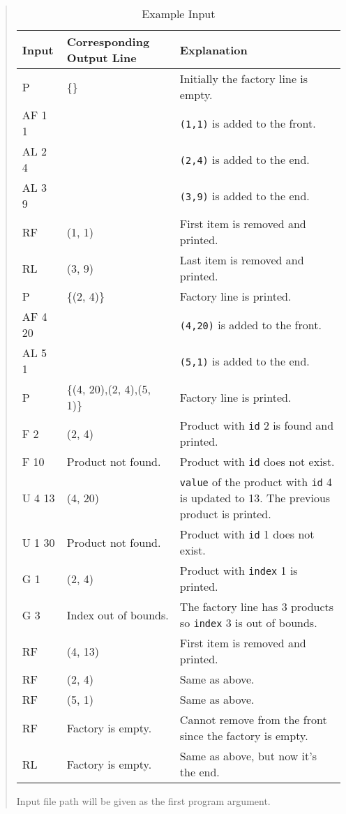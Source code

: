 \documentclass[12pt]{article}
\begin{document}
\begin{quote}
\begin{table}[H]
    \centering
    \begin{tabular}{||p{1.5cm}|p{3.8cm}|p{7cm}||}
        \hline
        \hline
        \textbf{Input} & \textbf{Corresponding \newline Output Line} & \textbf{Explanation}  \\
        \hline
        \hline
        P & \{\} & Initially the factory line is empty.  \\ 
        \hline
        AF 1 1 & & \texttt{(1,1)} is added to the front. \\
        \hline
        AL 2 4 & & \texttt{(2,4)} is added to the end. \\
        \hline
        AL 3 9 & & \texttt{(3,9)} is added to the end. \\
        \hline
        RF & (1, 1) & First item is removed and printed. \\
        \hline
        RL & (3, 9) & Last item is removed and printed. \\
        \hline
        P & \{(2, 4)\} & Factory line is printed. \\
        \hline
        AF 4 20 & & \texttt{(4,20)} is added to the front. \\
        \hline
        AL 5 1 & & \texttt{(5,1)} is added to the end. \\
        \hline
        P & \{(4, 20),(2, 4),(5, 1)\} & Factory line is printed. \\
        \hline
        F 2 & (2, 4) & Product with \texttt{id} 2 is found and printed. \\
        \hline
        F 10 & Product not found. & Product with \texttt{id} does not exist. \\
        \hline
        U 4 13 & (4, 20) & \texttt{value} of the product with \texttt{id} 4 
        is updated to 13. The previous product is printed. \\
        \hline
        U 1 30 & Product not found. & Product with \texttt{id} 1 does not exist.\\
        \hline
        G 1 & (2, 4) & Product with \texttt{index} 1 is printed. \\
        \hline
        G 3 & Index out of bounds. & The factory line has 3 products so \texttt{index} 3 is out of bounds. \\
        \hline
        RF & (4, 13) & First item is removed and printed. \\
        \hline
        RF & (2, 4) & Same as above. \\
        \hline
        RF &  (5, 1) & Same as above. \\
        \hline
        RF & Factory is empty. & Cannot remove from the front since the factory is empty. \\
        \hline
        RL & Factory is empty. & Same as above, but now it's the end. \\
        \hline
        \hline
    \end{tabular}
    \caption{Example Input}
    \label{tab:my_label}
\end{table}
\vspace{-10pt}
Input file path will be given as the first program argument.


\end{quote}
\end{document}
